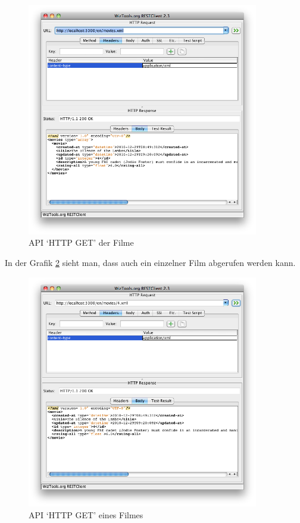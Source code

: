 \begin{figure}[ht]
    \begin{center}
        \includegraphics[width=0.9\textwidth,angle=0]{./bilder/tests/test_schnittstelle_01.png}
        \caption{API `HTTP GET' der Filme}
        \label{test_schnittstelle_01}
    \end{center}
\end{figure}

In der Grafik \ref{test_schnittstelle_02} sieht man, dass auch ein einzelner
Film abgerufen werden kann.

\begin{figure}[ht]
    \begin{center}
        \includegraphics[width=0.9\textwidth,angle=0]{./bilder/tests/test_schnittstelle_02.png}
        \caption{API `HTTP GET' eines Filmes}
        \label{test_schnittstelle_02}
    \end{center}
\end{figure}


